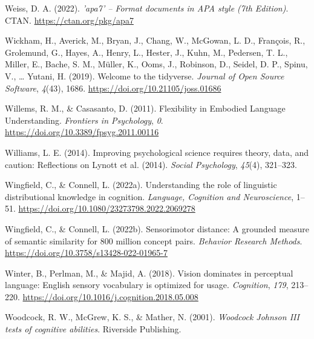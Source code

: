 \documentclass[
  12pt,
  man,floatsintext]{apa7}
\newlength{\cslhangindent}
\newlength{\cslentryspacingunit} %
\newenvironment{CSLReferences}[2] %
 {%
  \setlength{\parindent}{0pt}
  \ifodd #1
  \let\oldpar\par
  \def\par{\hangindent=\cslhangindent\oldpar}
  \fi
  \setlength{\parskip}{#2\cslentryspacingunit}
 }%
 {}
\begin{document}
\begin{CSLReferences}{1}{0}
\leavevmode{}%
Weiss, D. A. (2022). \emph{'{apa7}' -- {Format} documents in {APA} style (7th {Edition})}. {CTAN}. \url{https://ctan.org/pkg/apa7}

\leavevmode{}%
Wickham, H., Averick, M., Bryan, J., Chang, W., McGowan, L. D., François, R., Grolemund, G., Hayes, A., Henry, L., Hester, J., Kuhn, M., Pedersen, T. L., Miller, E., Bache, S. M., Müller, K., Ooms, J., Robinson, D., Seidel, D. P., Spinu, V., \ldots{} Yutani, H. (2019). Welcome to the {tidyverse}. \emph{Journal of Open Source Software}, \emph{4}(43), 1686. \url{https://doi.org/10.21105/joss.01686}

\leavevmode{}%
Willems, R. M., \& Casasanto, D. (2011). Flexibility in {Embodied Language Understanding}. \emph{Frontiers in Psychology}, \emph{0}. \url{https://doi.org/10.3389/fpsyg.2011.00116}

\leavevmode{}%
Williams, L. E. (2014). Improving psychological science requires theory, data, and caution: {Reflections} on {Lynott} et al. (2014). \emph{Social Psychology}, \emph{45}(4), 321--323.

\leavevmode{}%
Wingfield, C., \& Connell, L. (2022a). Understanding the role of linguistic distributional knowledge in cognition. \emph{Language, Cognition and Neuroscience}, 1--51. \url{https://doi.org/10.1080/23273798.2022.2069278}

\leavevmode{}%
Wingfield, C., \& Connell, L. (2022b). Sensorimotor distance: {A} grounded measure of semantic similarity for 800 million concept pairs. \emph{Behavior Research Methods}. \url{https://doi.org/10.3758/s13428-022-01965-7}

\leavevmode{}%
Winter, B., Perlman, M., \& Majid, A. (2018). Vision dominates in perceptual language: {English} sensory vocabulary is optimized for usage. \emph{Cognition}, \emph{179}, 213--220. \url{https://doi.org/10.1016/j.cognition.2018.05.008}

\leavevmode{}%
Woodcock, R. W., McGrew, K. S., \& Mather, N. (2001). \emph{Woodcock {Johnson III} tests of cognitive abilities}. {Riverside Publishing}.


\end{CSLReferences}
\end{document}
